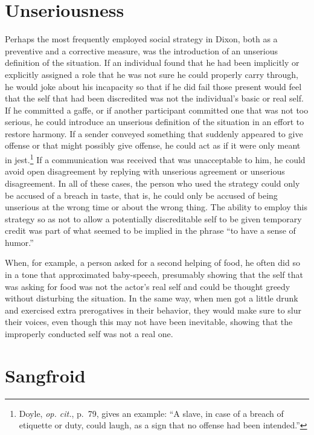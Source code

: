 \documentclass[openany,nobib]{tufte-book}
\begin{document}
\hypertarget{unseriousness}{%
\section{Unseriousness}\label{unseriousness}}

Perhaps the most frequently employed social strategy in Dixon, both as a
preventive and a corrective measure, was the introduction of an
unserious definition of the situation. If an individual found that he
had been implicitly or explicitly assigned a role that he was not sure
he could properly carry through, he would joke about his incapacity so
that if he did fail those present would feel that the self that had been
discredited was not the individual's basic or real self. If he committed
a gaffe, or if another participant committed one that was not too
serious, he could introduce an unserious definition of the situation in
an effort to restore harmony. If a sender conveyed something that
suddenly appeared to give offense or that might possibly give offense,
he could act as if it were only meant in jest.\footnote{Doyle, \emph{op.
  cit.}, p.~79, gives an example: ``A slave, in case of a breach of
  etiquette or duty, could laugh, as a sign that no offense had been
  intended.''} If a communication was received that was unacceptable to
him, he could avoid open disagreement by replying with unserious
agreement or unserious disagreement. In all of these cases, the person
who used the strategy could only be accused of a breach in taste, that
is, he could only be accused of being unserious at the wrong time or
about the wrong thing. The ability to employ this strategy so as not to
allow a potentially discreditable self to be given temporary credit was
part of what seemed to be implied in the phrase ``to have a sense of
humor.''

When, for example, a person asked for a second helping of food, he often
did so in a tone that approximated baby-speech, presumably showing that
the self that was asking for food was not the actor's real self and
could be thought greedy without disturbing the situation. In the same
way, when men got a little drunk and exercised extra prerogatives in
their behavior, they would make sure to slur their voices, even though
this may not have been inevitable, showing that the improperly conducted
self was not a real one.

\hypertarget{sangfroid}{%
\section{Sangfroid}\label{sangfroid}}
\end{document}
